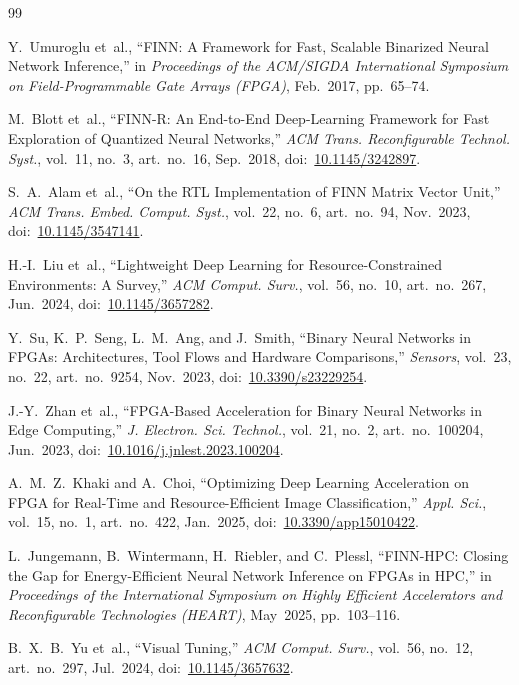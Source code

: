 \documentclass[12pt, a4paper]{report}
\numberwithin{equation}{chapter}
\numberwithin{figure}{chapter}
\numberwithin{table}{chapter}
\numberwithin{algorithm}{chapter}
\begin{document}
\begin{thebibliography}{99}

Y.~Umuroglu et~al.,
``FINN: A Framework for Fast, Scalable Binarized Neural Network Inference,''
in \emph{Proceedings of the ACM/SIGDA International Symposium on Field-Programmable Gate Arrays (FPGA)}, Feb.~2017, pp.~65--74.


M.~Blott et~al.,
``FINN-R: An End-to-End Deep-Learning Framework for Fast Exploration of Quantized Neural Networks,''
\emph{ACM Trans. Reconfigurable Technol. Syst.}, vol.~11, no.~3, art.~no.~16, Sep.~2018,
doi:~\url{10.1145/3242897}.

S.~A.~Alam et~al.,
``On the RTL Implementation of FINN Matrix Vector Unit,''
\emph{ACM Trans. Embed. Comput. Syst.}, vol.~22, no.~6, art.~no.~94, Nov.~2023,
doi:~\url{10.1145/3547141}.

H.-I.~Liu et~al.,
``Lightweight Deep Learning for Resource-Constrained Environments: A Survey,''
\emph{ACM Comput. Surv.}, vol.~56, no.~10, art.~no.~267, Jun.~2024,
doi:~\url{10.1145/3657282}.

Y.~Su, K.~P.~Seng, L.~M.~Ang, and J.~Smith,
``Binary Neural Networks in FPGAs: Architectures, Tool Flows and Hardware Comparisons,''
\emph{Sensors}, vol.~23, no.~22, art.~no.~9254, Nov.~2023,
doi:~\url{10.3390/s23229254}.

J.-Y.~Zhan et~al.,
``FPGA-Based Acceleration for Binary Neural Networks in Edge Computing,''
\emph{J. Electron. Sci. Technol.}, vol.~21, no.~2, art.~no.~100204, Jun.~2023,
doi:~\url{10.1016/j.jnlest.2023.100204}.

A.~M.~Z.~Khaki and A.~Choi,
``Optimizing Deep Learning Acceleration on FPGA for Real-Time and Resource-Efficient Image Classification,''
\emph{Appl. Sci.}, vol.~15, no.~1, art.~no.~422, Jan.~2025,
doi:~\url{10.3390/app15010422}.

L.~Jungemann, B.~Wintermann, H.~Riebler, and C.~Plessl,
``FINN-HPC: Closing the Gap for Energy-Efficient Neural Network Inference on FPGAs in HPC,''
in \emph{Proceedings of the International Symposium on Highly Efficient Accelerators and Reconfigurable Technologies (HEART)}, May~2025, pp.~103--116.

B.~X.~B.~Yu et~al.,
``Visual Tuning,''
\emph{ACM Comput. Surv.}, vol.~56, no.~12, art.~no.~297, Jul.~2024,
doi:~\url{10.1145/3657632}.


\end{thebibliography}
\end{document}
